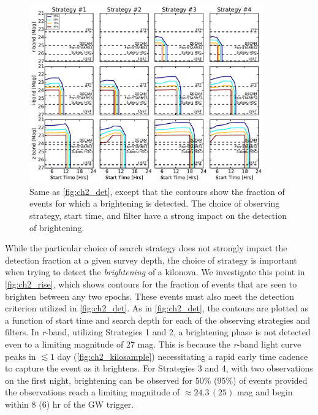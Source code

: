 \begin{figure}[t!]
\centering
\includegraphics[width=0.9\textwidth]{./figs/chapter2/ch2_f5.pdf}
\caption{Same as \autoref{fig:ch2_det}, except that the contours show the fraction of events for which a brightening is detected. The choice of observing strategy, start time, and filter have a strong impact on the detection of brightening.}
\label{fig:ch2_rise}
\end{figure}

While the particular choice of search strategy does not strongly impact the detection fraction at a given survey depth, the choice of strategy is important when trying to detect the {\em brightening} of a kilonova. We investigate this point in \autoref{fig:ch2_rise}, which shows contours for the fraction of events that are seen to brighten between any two epochs. These events must also meet the detection criterion utilized in \autoref{fig:ch2_det}. As in \autoref{fig:ch2_det}, the contours are plotted as a function of start time and search depth for each of the observing strategies and filters. In {\em r}-band, utilizing Strategies 1 and 2, a brightening phase is not detected even to a limiting magnitude of 27 mag. This is because the {\em r}-band light curve peaks in $\lesssim 1$ day (\autoref{fig:ch2_kilosample}) necessitating a rapid early time cadence to capture the event as it brightens. For Strategies 3 and 4, with two observations on the first night, brightening can be observed for 50\% (95\%) of events provided the observations reach a limiting magnitude of $\approx24.3\,(25)$ mag and begin within 8 (6) hr of the GW trigger.

